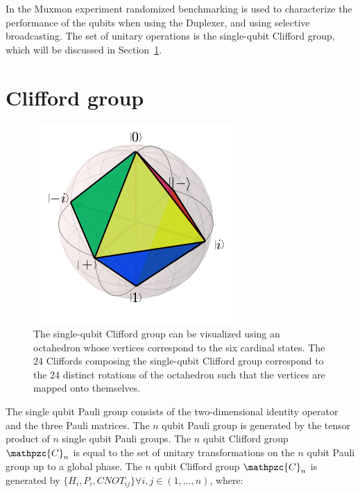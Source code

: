       In the Muxmon experiment randomized benchmarking is used to characterize the performance of the qubits when using the Duplexer, and using selective broadcasting. The set of unitary operations is the single-qubit Clifford group, which will be discussed in Section~\ref{sec:Clifford group}.
    \section{Clifford group}
      \label{sec:Clifford group}

      \begin{figure}[h]%
        \begin{center}
          \includegraphics[width=.5\textwidth]{../Figures/Randomized benchmarking/Bloch sphere octahedron.png}
        \end{center}
        \caption{The single-qubit Clifford group can be visualized using an octahedron whose vertices correspond to the six cardinal states. The 24 Cliffords composing the single-qubit Clifford group correspond to the 24 distinct rotations of the octahedron such that the vertices are mapped onto themselves.}
        \label{fig:Clifford octahedron}
      \end{figure}

      The single qubit Pauli group consists of the two-dimensional identity operator and the three Pauli matrices. The $n$ qubit Pauli group is generated by the tensor product of $n$ single qubit Pauli groups. The $n$ qubit Clifford group $\mathpzc{C}_n$ is equal to the set of unitary transformations on the $n$ qubit Pauli group up to a global phase. The $n$ qubit Clifford group $\mathpzc{C}_n$ is generated by $\{H_i, P_i, CNOT_{ij}\} \forall i, j \in (1, \dots, n)$, where:

